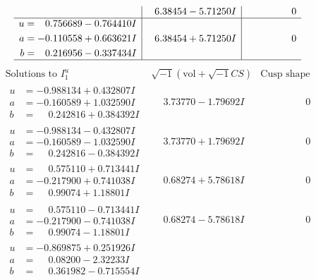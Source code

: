 \documentclass[1p]{elsarticle_modified}
\theoremstyle{definition}
\newcommand{\I}{\sqrt{-1}}
\begin{document}
$$\begin{array}{c|c|c}
 & \phantom{-}6.38454 - 5.71250 I & \phantom{-0.000000 } 0 \\ \hline\begin{aligned}
u &= \phantom{-}0.756689 - 0.764410 I \\
a &= -0.110558 + 0.663621 I \\
b &= \phantom{-}0.216956 - 0.337434 I\end{aligned}
 & \phantom{-}6.38454 + 5.71250 I & \phantom{-0.000000 } 0\\
 \hline 
 \end{array}$$\newpage$$\begin{array}{c|c|c}  
\text{Solutions to }I^u_{1}& \I (\text{vol} + \sqrt{-1}CS) & \text{Cusp shape}\\
 \hline 
\begin{aligned}
u &= -0.988134 + 0.432807 I \\
a &= -0.160589 + 1.032590 I \\
b &= \phantom{-}0.242816 + 0.384392 I\end{aligned}
 & \phantom{-}3.73770 - 1.79692 I & \phantom{-0.000000 } 0 \\ \hline\begin{aligned}
u &= -0.988134 - 0.432807 I \\
a &= -0.160589 - 1.032590 I \\
b &= \phantom{-}0.242816 - 0.384392 I\end{aligned}
 & \phantom{-}3.73770 + 1.79692 I & \phantom{-0.000000 } 0 \\ \hline\begin{aligned}
u &= \phantom{-}0.575110 + 0.713441 I \\
a &= -0.217900 + 0.741038 I \\
b &= \phantom{-}0.99074 + 1.18801 I\end{aligned}
 & \phantom{-}0.68274 + 5.78618 I & \phantom{-0.000000 } 0 \\ \hline\begin{aligned}
u &= \phantom{-}0.575110 - 0.713441 I \\
a &= -0.217900 - 0.741038 I \\
b &= \phantom{-}0.99074 - 1.18801 I\end{aligned}
 & \phantom{-}0.68274 - 5.78618 I & \phantom{-0.000000 } 0 \\ \hline\begin{aligned}
u &= -0.869875 + 0.251926 I \\
a &= \phantom{-}0.08200 - 2.32233 I \\
b &= \phantom{-}0.361982 - 0.715554 I\end{aligned}

\end{array}$$
\end{document}
